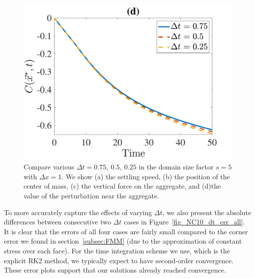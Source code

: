 \begin{figure}[ht]
\begin{center}
		\includegraphics[scale=0.35]{./figures/fig_NC10_dt_C_star}
	\caption{Compare various $\Delta t = 0.75, \ 0.5, \ 0.25$ in the domain size factor $s = 5$ with $\Delta x = 1$. We show (a) the settling speed, (b) the position of the center of mass, (c) the vertical force on the aggregate, and (d)the value of the perturbation near the aggregate.}
	\label{fig_NC10_compare_dt}
\end{center}
\end{figure}
\par
To more accurately capture the effects of varying $\Delta t$, we also present the absolute differences between consecutive two $\Delta t$ cases in Figure~\ref{fig_NC10_dt_err_all}.
It is clear that the errors of all four cases are fairly small compared to the corner error we found in section~\ref{subsec:FMM} (due to the approximation of constant stress over each face). For the time integration scheme we use, which is the explicit RK2 method, we typically expect to have second-order convergence. These error plots support that our solutions already reached convergence.
